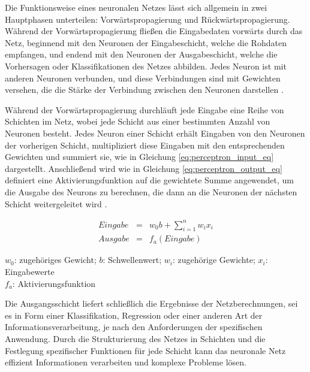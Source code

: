 Die Funktionsweise eines neuronalen Netzes lässt sich allgemein in zwei Hauptphasen unterteilen: Vorwärtspropagierung und Rückwärtspropagierung. Während der Vorwärtspropagierung fließen die Eingabedaten vorwärts durch das Netz, beginnend mit den Neuronen der Eingabeschicht, welche die Rohdaten empfangen, und endend mit den Neuronen der Ausgabeschicht, welche die Vorhersagen oder Klassifikationen des Netzes abbilden. Jedes Neuron ist mit anderen Neuronen verbunden, und diese Verbindungen sind mit Gewichten versehen, die die Stärke der Verbindung zwischen den Neuronen darstellen  \citep{Manuela_Kunstliche_Intelligenz}.

Während der Vorwärtspropagierung durchläuft jede Eingabe eine Reihe von Schichten im Netz, wobei jede Schicht aus einer bestimmten Anzahl von Neuronen besteht. Jedes Neuron einer Schicht erhält Eingaben von den Neuronen der vorherigen Schicht, multipliziert diese Eingaben mit den entsprechenden Gewichten und summiert sie, wie in Gleichung \ref{eq:perceptron_input_eq} dargestellt. Anschließend wird wie in Gleichung \ref{eq:perceptron_output_eq} definiert eine Aktivierungsfunktion auf die gewichtete Summe angewendet, um die Ausgabe des Neurons zu berechnen, die dann an die Neuronen der nächsten Schicht weitergeleitet wird \citep{thesis_Artur_Brening}.

\begin{eqnarray}
    Eingabe&=&w_0b+\sum_{i=1}^{n}w_ix_i \label{eq:perceptron_input_eq} \\
    Ausgabe&=&f_a(Eingabe) \label{eq:perceptron_output_eq}
\end{eqnarray}

\begin{center}
    \begin{footnotesize}
        $w_0$: zugehöriges Gewicht; $b$: Schwellenwert; $w_i$: zugehörige Gewichte; $x_i$: Eingabewerte\\
        $f_a$: Aktivierungsfunktion
    \end{footnotesize}
\end{center}

Die Ausgangsschicht liefert schließlich die Ergebnisse der Netzberechnungen, sei es in Form einer Klassifikation, Regression oder einer anderen Art der Informationsverarbeitung, je nach den Anforderungen der spezifischen Anwendung. Durch die Strukturierung des Netzes in Schichten und die Festlegung spezifischer Funktionen für jede Schicht kann das neuronale Netz effizient Informationen verarbeiten und komplexe Probleme lösen.

